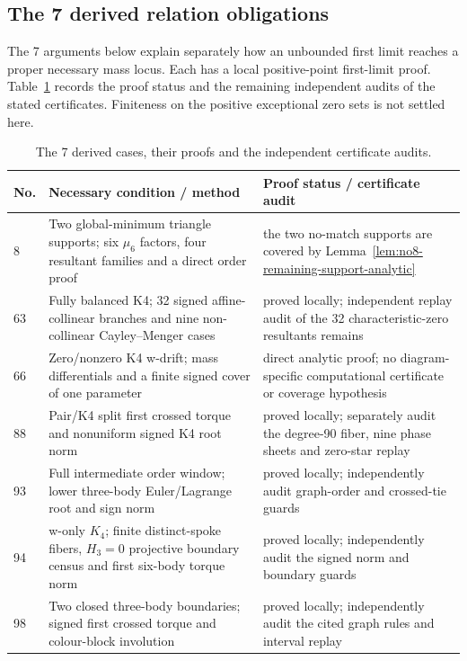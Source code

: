 \documentclass[11pt]{amsart}
\theoremstyle{remark}
\begin{document}
\subsection*{The 7 derived relation obligations}
The 7 arguments below explain separately how an unbounded
first limit reaches a proper necessary mass locus. Each has a
local positive-point first-limit proof. Table~\ref{tab:derived}
records the proof status and the remaining independent audits of the stated certificates. Finiteness on the positive exceptional zero
sets is not settled here.
\begin{table}[ht]

\centering\small

\setlength{\tabcolsep}{4pt}
\begin{tabular}{p{1.2cm}p{8.2cm}p{5.4cm}}

\hline

No. & Necessary condition / method & Proof status / certificate audit \\
\hline

8 & Two global-minimum triangle supports; six $\mu_6$ factors,
four resultant families and a direct order proof
& the two no-match supports are covered by Lemma~\ref{lem:no8-remaining-support-analytic} \\

63 & Fully balanced K4; 32 signed affine-collinear branches and nine
non-collinear Cayley--Menger cases & proved locally; independent
replay audit of the 32 characteristic-zero resultants remains \\

66 & Zero/nonzero K4 w-drift; mass differentials and a finite
signed cover of one parameter & direct analytic proof; no diagram-specific
computational certificate or coverage hypothesis \\

88 & Pair/K4 split first crossed torque and nonuniform signed K4
root norm & proved locally; separately audit the degree-90 fiber,
nine phase sheets and zero-star replay \\
93 & Full intermediate order window; lower three-body Euler/Lagrange
root and sign norm & proved locally; independently audit graph-order
and crossed-tie guards \\
94 & w-only $K_4$; finite distinct-spoke fibers, $H_3=0$ projective
boundary census and first six-body torque norm & proved locally;
independently audit the signed norm and boundary guards \\
98 & Two closed three-body boundaries; signed first crossed torque
and colour-block involution & proved locally; independently audit
the cited graph rules and interval replay \\

\hline

\end{tabular}

\caption{The 7 derived cases, their proofs and the independent certificate audits.}

\label{tab:derived}

\end{table}
\end{document}
